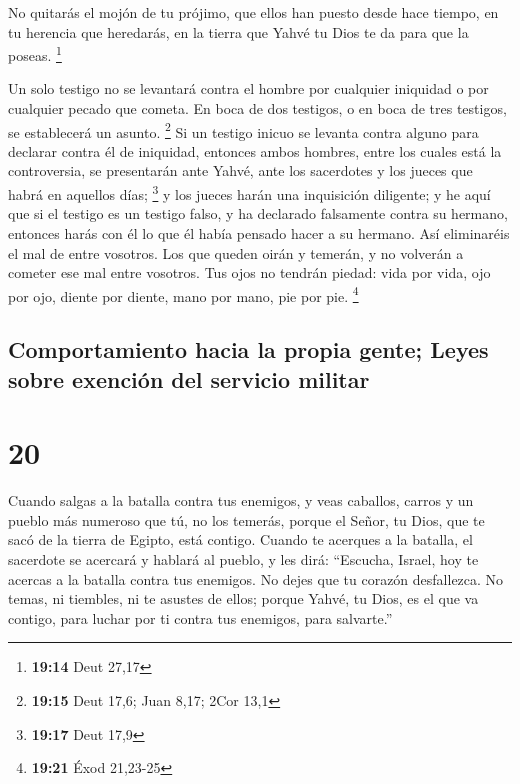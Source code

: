  No quitarás el mojón de tu prójimo, que ellos han puesto
desde hace tiempo, en tu herencia que heredarás, en la tierra que Yahvé
tu Dios te da para que la poseas. \footnote{\textbf{19:14} Deut 27,17}

 Un solo testigo no se levantará contra el hombre por
cualquier iniquidad o por cualquier pecado que cometa. En boca de dos
testigos, o en boca de tres testigos, se establecerá un asunto.
\footnote{\textbf{19:15} Deut 17,6; Juan 8,17; 2Cor 13,1}
 Si un testigo inicuo se levanta contra alguno para
declarar contra él de iniquidad,  entonces ambos hombres,
entre los cuales está la controversia, se presentarán ante Yahvé, ante
los sacerdotes y los jueces que habrá en aquellos días; \footnote{\textbf{19:17}
  Deut 17,9}  y los jueces harán una inquisición
diligente; y he aquí que si el testigo es un testigo falso, y ha
declarado falsamente contra su hermano,  entonces harás
con él lo que él había pensado hacer a su hermano. Así eliminaréis el
mal de entre vosotros.  Los que queden oirán y temerán, y
no volverán a cometer ese mal entre vosotros.  Tus ojos
no tendrán piedad: vida por vida, ojo por ojo, diente por diente, mano
por mano, pie por pie. \footnote{\textbf{19:21} Éxod 21,23-25}

\hypertarget{comportamiento-hacia-la-propia-gente-leyes-sobre-exenciuxf3n-del-servicio-militar}{%
\subsection{Comportamiento hacia la propia gente; Leyes sobre exención
del servicio
militar}\label{comportamiento-hacia-la-propia-gente-leyes-sobre-exenciuxf3n-del-servicio-militar}}

\hypertarget{section-19}{%
\section{20}\label{section-19}}

 Cuando salgas a la batalla contra tus enemigos, y veas
caballos, carros y un pueblo más numeroso que tú, no los temerás, porque
el Señor, tu Dios, que te sacó de la tierra de Egipto, está contigo.
 Cuando te acerques a la batalla, el sacerdote se acercará
y hablará al pueblo,  y les dirá: ``Escucha, Israel, hoy
te acercas a la batalla contra tus enemigos. No dejes que tu corazón
desfallezca. No temas, ni tiembles, ni te asustes de ellos;
 porque Yahvé, tu Dios, es el que va contigo, para luchar
por ti contra tus enemigos, para salvarte.''

